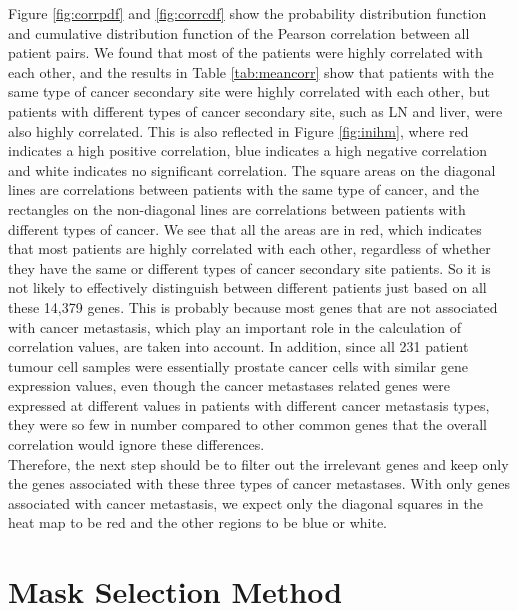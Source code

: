 \documentclass[12pt,a4paper]{report}
\begin{document}
Figure \ref{fig:corrpdf} and \ref{fig:corrcdf} show the probability distribution function and cumulative distribution function of the Pearson correlation between all patient pairs. We found that most of the patients were highly correlated with each other, and the results in Table \ref{tab:meancorr} show that patients with the same type of cancer secondary site were highly correlated with each other, but patients with different types of cancer secondary site, such as LN and liver, were also highly correlated. This is also reflected in Figure \ref{fig:inihm}, where red indicates a high positive correlation, blue indicates a high negative correlation and white indicates no significant correlation. The square areas on the diagonal lines are correlations between patients with the same type of cancer, and the rectangles on the non-diagonal lines are correlations between patients with different types of cancer. We see that all the areas are in red, which indicates that most patients are highly correlated with each other, regardless of whether they have the same or different types of cancer secondary site patients. So it is not likely to effectively distinguish between different patients just based on all these 14,379 genes. This is probably because most genes that are not associated with cancer metastasis, which play an important role in the calculation of correlation values, are taken into account. In addition, since all 231 patient tumour cell samples were essentially prostate cancer cells with similar gene expression values, even though the cancer metastases related genes were expressed at different values in patients with different cancer metastasis types, they were so few in number compared to other common genes that the overall correlation would ignore these differences. \\

Therefore, the next step should be to filter out the irrelevant genes and keep only the genes associated with these three types of cancer metastases. With only genes associated with cancer metastasis, we expect only the diagonal squares in the heat map to be red and the other regions to be blue or white.


\section{Mask Selection Method}
\end{document}

